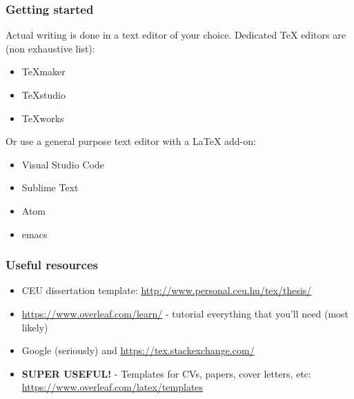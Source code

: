 \documentclass{beamer}
\begin{document}
\begin{frame}
\frametitle{Getting started}
Actual writing is done in a text editor of your choice. Dedicated TeX editors are (non exhaustive list):

\begin{itemize}
		\item TeXmaker
		\item TeXstudio
		\item TeXworks
\end{itemize}

Or use a general purpose text editor with a LaTeX add-on:

\begin{itemize}
	\item Visual Studio Code
	\item Sublime Text
	\item Atom
	\item emacs
\end{itemize}

\end{frame}


\begin{frame}
\frametitle{Useful resources}
\begin{itemize}
\item CEU dissertation template: \url{http://www.personal.ceu.hu/tex/thesis/}
\item \url{https://www.overleaf.com/learn/} - tutorial everything that you'll need (most likely)
\item Google (seriously) and \url{https://tex.stackexchange.com/}
\item \textbf{SUPER USEFUL!} - Templates for CVs, papers, cover letters, etc: \url{https://www.overleaf.com/latex/templates}
\end{itemize}
\end{frame}


\end{document}
